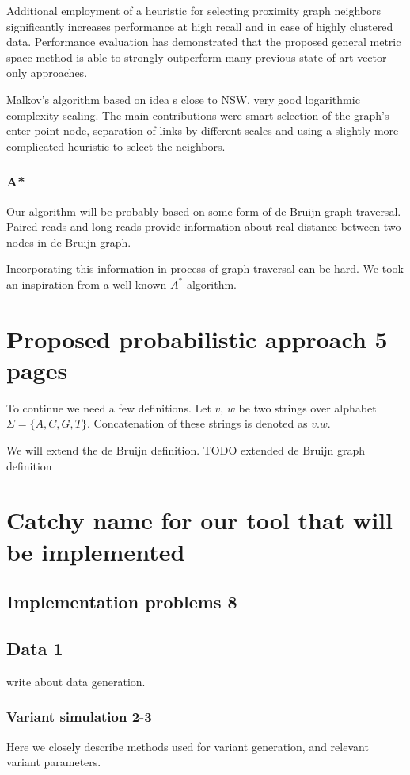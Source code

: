Additional employment of a heuristic for selecting proximity graph neighbors significantly increases performance at high recall and in case of highly clustered data. 
Performance evaluation has demonstrated that the proposed general metric space method is able to strongly outperform many previous state-of-art vector-only approaches. 

Malkov's\cite{malkov2016efficient} algorithm based on idea s close to NSW, very good logarithmic complexity scaling. 
The main contributions were smart selection of the graph’s enter-point node, separation of links by different scales and using a slightly more complicated heuristic to select the neighbors. 

\subsection{A*}
Our algorithm will be probably based on some form of de Bruijn graph traversal. 
Paired reads and long reads provide information about real distance between two nodes in de Bruijn graph.

Incorporating this information in process of graph traversal can be hard. 
We took an inspiration from a well known $A^*$ algorithm.


\chapter{Proposed probabilistic approach 5 pages}
To continue we need a few definitions. Let $v$, $w$ be two strings over alphabet $\Sigma = \{A, C, G, T \}$. Concatenation of these strings is denoted as $v . w$. 

We will extend the de Bruijn definition. TODO extended de Bruijn graph definition


\chapter{Catchy name for our tool that will be implemented}
\section{Implementation problems 8}
\section{Data 1}
write about data generation.
\subsection{Variant simulation 2-3}
Here we closely describe methods used for variant generation, and relevant variant parameters.
